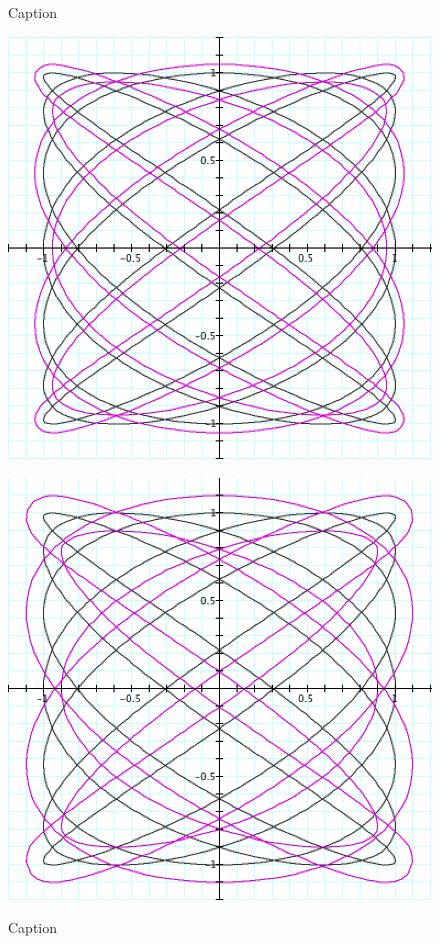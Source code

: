 {\begin{figure}[H]
\begin{minipage}[b]{\w}
      \caption{Caption}
      \vspace{4ex}
    \end{minipage} %
    \begin{minipage}[b]{\w}
      \centering
      \label{parametric:4}
      \includegraphics[width=\fw]{img/15-parametric/04.png}
      \caption{Caption}
      \vspace{4ex}
    \end{minipage} %
    \begin{minipage}[b]{\w}
      \centering
      \label{parametric:5}
      \includegraphics[width=\fw]{img/15-parametric/05.png}

\end{minipage}
\end{figure}}
